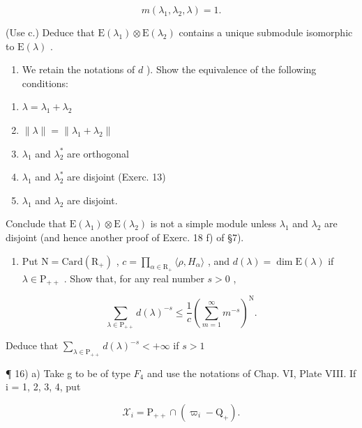 \[
m (\lambda_ {1}, \lambda_ {2}, \lambda) = 1.
\]

(Use c.) Deduce that \(\mathrm{E}(\lambda_1) \otimes \mathrm{E}(\lambda_2)\) contains a unique submodule isomorphic to \(\mathrm{E}(\lambda)\) .

\begin{enumerate}
\def\labelenumi{\alph{enumi})}
\setcounter{enumi}{4}
\tightlist
\item
  We retain the notations of \(d\) ). Show the equivalence of the following conditions:
\end{enumerate}

\begin{enumerate}
\def\labelenumi{(\roman{enumi})}
\item
  \(\lambda = \lambda_{1} + \lambda_{2}\)
\item
  \(\| \lambda \| = \| \lambda_1 + \lambda_2 \|\)
\item
  \(\lambda_{1}\) and \(\lambda_2^*\) are orthogonal
\item
  \(\lambda_{1}\) and \(\lambda_2^*\) are disjoint (Exerc. 13)
\item
  \(\lambda_{1}\) and \(\lambda_{2}\) are disjoint.
\end{enumerate}

Conclude that \(\mathrm{E}(\lambda_{1})\otimes\mathrm{E}(\lambda_{2})\) is not a simple module unless \(\lambda_{1}\) and \(\lambda_{2}\) are disjoint (and hence another proof of Exerc. 18 f) of §7).

\begin{enumerate}
\def\labelenumi{\arabic{enumi})}
\setcounter{enumi}{14}
\tightlist
\item
  Put \(\mathrm{N} = \mathrm{Card}(\mathrm{R}_{+})\) , \(c = \prod_{\alpha \in \mathrm{R}_{+}} \langle \rho, H_{\alpha} \rangle\) , and \(d(\lambda) = \dim \mathrm{E}(\lambda)\) if \(\lambda \in \mathrm{P}_{++}\) . Show that, for any real number \(s > 0\) ,
\end{enumerate}

\[
\sum_ {\lambda \in \mathrm{P} _ {+ +}} d (\lambda) ^ {- s} \leq \frac {1}{c} \left(\sum_ {m = 1} ^ {\infty} m ^ {- s}\right) ^ {\mathrm{N}}.
\]

Deduce that \(\sum_{\lambda \in \mathrm{P}_{+ + }}d(\lambda)^{-s} <   + \infty\) if \(s > 1\)

¶ 16) a) Take g to be of type \(F_{4}\) and use the notations of Chap. VI, Plate VIII. If i = 1, 2, 3, 4, put

\[
\mathcal {X} _ {i} = \mathrm{P} _ {+ +} \cap (\varpi_ {i} - \mathrm{Q} _ {+}).
\]

